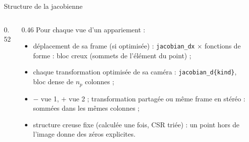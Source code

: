 \documentclass[aspectratio=169,11pt]{beamer}
\newcommand{\code}[1]{\texttt{\small #1}}
\begin{document}
\begin{frame}{Structure de la jacobienne}
  \begin{columns}[c]
    \begin{column}{0.52\textwidth}
      \centering
    \end{column}
    \begin{column}{0.46\textwidth}\footnotesize
      Pour chaque vue d'un appariement :
      \begin{itemize}
        \item \alert{déplacement} de sa frame (si optimisée) :
              \code{jacobian\_dx} $\times$ fonctions de forme : bloc
              \alert{creux} (sommets de l'élément du point) ;
        \item chaque \alert{transformation} optimisée de sa caméra :
              \code{jacobian\_d\{kind\}}, bloc \alert{dense} de $n_p$ colonnes ;
        \item $-$ vue 1, $+$ vue 2 ; transformation partagée ou même frame en
              stéréo : \alert{sommées} dans les mêmes colonnes ;
        \item structure creuse \alert{fixe} (calculée une fois, CSR triée) : un
              point hors de l'image donne des zéros explicites.
      \end{itemize}
    \end{column}
  \end{columns}
\end{frame}
\end{document}
